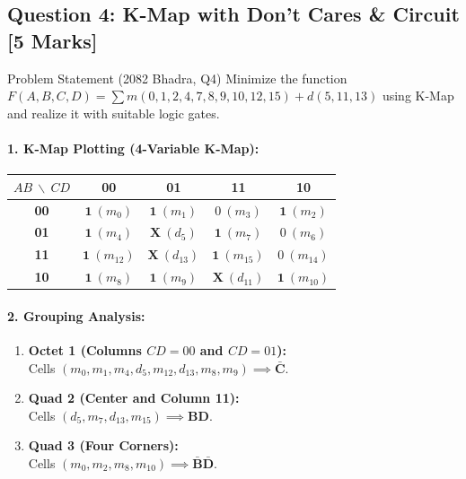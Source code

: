 \documentclass[11pt,a4paper,oneside]{book}
\begin{document}
\subsection{Question 4: K-Map with Don't Cares \& Circuit [5 Marks]}
\begin{questionbox}{Problem Statement (2082 Bhadra, Q4)}
Minimize the function $F(A, B, C, D) = \sum m(0,1,2,4,7,8,9,10,12,15) + d(5,11,13)$ using K-Map and realize it with suitable logic gates.
\end{questionbox}

\paragraph{1. K-Map Plotting (4-Variable K-Map):}
\begin{center}
\begin{tabular}{|c|c|c|c|c|}
\hline
$AB \ \backslash \ CD$ & \textbf{00} & \textbf{01} & \textbf{11} & \textbf{10} \\ \hline
\textbf{00} & $\mathbf{1}\ (m_0)$ & $\mathbf{1}\ (m_1)$ & $0\ (m_3)$ & $\mathbf{1}\ (m_2)$ \\ \hline
\textbf{01} & $\mathbf{1}\ (m_4)$ & $\mathbf{X}\ (d_5)$ & $\mathbf{1}\ (m_7)$ & $0\ (m_6)$ \\ \hline
\textbf{11} & $\mathbf{1}\ (m_{12})$ & $\mathbf{X}\ (d_{13})$ & $\mathbf{1}\ (m_{15})$ & $0\ (m_{14})$ \\ \hline
\textbf{10} & $\mathbf{1}\ (m_8)$ & $\mathbf{1}\ (m_9)$ & $\mathbf{X}\ (d_{11})$ & $\mathbf{1}\ (m_{10})$ \\ \hline
\end{tabular}
\end{center}

\paragraph{2. Grouping Analysis:}
\begin{enumerate}
  \item \textbf{Octet 1 (Columns $CD=00$ and $CD=01$):} \\
  Cells $(m_0, m_1, m_4, d_5, m_{12}, d_{13}, m_8, m_9) \implies \mathbf{\bar{C}}$.
  \item \textbf{Quad 2 (Center and Column 11):} \\
  Cells $(d_5, m_7, d_{13}, m_{15}) \implies \mathbf{BD}$.
  \item \textbf{Quad 3 (Four Corners):} \\
  Cells $(m_0, m_2, m_8, m_{10}) \implies \mathbf{\bar{B}\bar{D}}$.
\end{enumerate}
\end{document}
